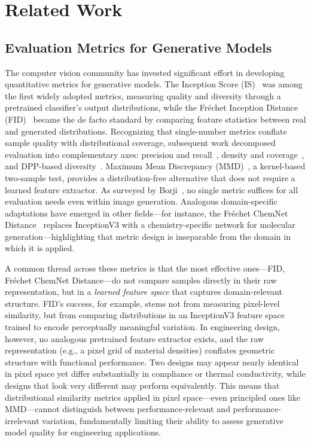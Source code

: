 \section{Related Work}
\label{sec:related_work}

\subsection{Evaluation Metrics for Generative Models}
\label{sec:genai_metrics}

The computer vision community has invested significant effort in developing quantitative metrics for generative models.
The Inception Score (IS)~\cite{salimans2016improved} was among the first widely adopted metrics, measuring quality and diversity through a pretrained classifier's output distributions, while the Fr\'{e}chet Inception Distance (FID)~\cite{heusel2017gans} became the de facto standard by comparing feature statistics between real and generated distributions.
Recognizing that single-number metrics conflate sample quality with distributional coverage, subsequent work decomposed evaluation into complementary axes: precision and recall~\cite{kynkaanniemi2019improved}, density and coverage~\cite{naeem2020reliable}, and DPP-based diversity~\cite{elfeki2019gdpp}.
Maximum Mean Discrepancy (MMD)~\cite{gretton2012kernel}, a kernel-based two-sample test, provides a distribution-free alternative that does not require a learned feature extractor.
As surveyed by Borji~\cite{borji2022pros}, no single metric suffices for all evaluation needs even within image generation.
Analogous domain-specific adaptations have emerged in other fields---for instance, the Fr\'{e}chet ChemNet Distance~\cite{preuer2018frechet} replaces InceptionV3 with a chemistry-specific network for molecular generation---highlighting that metric design is inseparable from the domain in which it is applied.

A common thread across these metrics is that the most effective ones---FID, Fr\'{e}chet ChemNet Distance---do not compare samples directly in their raw representation, but in a \emph{learned feature space} that captures domain-relevant structure.
FID's success, for example, stems not from measuring pixel-level similarity, but from comparing distributions in an InceptionV3 feature space trained to encode perceptually meaningful variation.
In engineering design, however, no analogous pretrained feature extractor exists, and the raw representation (e.g., a pixel grid of material densities) conflates geometric structure with functional performance.
Two designs may appear nearly identical in pixel space yet differ substantially in compliance or thermal conductivity, while designs that look very different may perform equivalently.
This means that distributional similarity metrics applied in pixel space---even principled ones like MMD---cannot distinguish between performance-relevant and performance-irrelevant variation, fundamentally limiting their ability to assess generative model quality for engineering applications.

